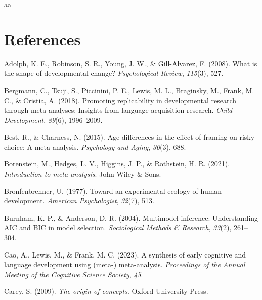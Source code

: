 \documentclass[
  man]{apa6}
\newlength{\cslhangindent}
\newlength{\cslentryspacingunit} %
\newenvironment{CSLReferences}[2] %
 {%
  \setlength{\parindent}{0pt}
  \ifodd #1
  \let\oldpar\par
  \def\par{\hangindent=\cslhangindent\oldpar}
  \fi
  \setlength{\parskip}{#2\cslentryspacingunit}
 }%
 {}
\begin{document}
aa

\newpage

\hypertarget{references}{%
\section{References}\label{references}}

\hypertarget{refs}{}
\begin{CSLReferences}{1}{0}
\leavevmode{}%
Adolph, K. E., Robinson, S. R., Young, J. W., \& Gill-Alvarez, F. (2008). What is the shape of developmental change? \emph{Psychological Review}, \emph{115}(3), 527.

\leavevmode{}%
Bergmann, C., Tsuji, S., Piccinini, P. E., Lewis, M. L., Braginsky, M., Frank, M. C., \& Cristia, A. (2018). Promoting replicability in developmental research through meta-analyses: Insights from language acquisition research. \emph{Child Development}, \emph{89}(6), 1996--2009.

\leavevmode{}%
Best, R., \& Charness, N. (2015). Age differences in the effect of framing on risky choice: A meta-analysis. \emph{Psychology and Aging}, \emph{30}(3), 688.

\leavevmode{}%
Borenstein, M., Hedges, L. V., Higgins, J. P., \& Rothstein, H. R. (2021). \emph{Introduction to meta-analysis}. John Wiley \& Sons.

\leavevmode{}%
Bronfenbrenner, U. (1977). Toward an experimental ecology of human development. \emph{American Psychologist}, \emph{32}(7), 513.

\leavevmode{}%
Burnham, K. P., \& Anderson, D. R. (2004). Multimodel inference: Understanding AIC and BIC in model selection. \emph{Sociological Methods \& Research}, \emph{33}(2), 261--304.

\leavevmode{}%
Cao, A., Lewis, M., \& Frank, M. C. (2023). A synthesis of early cognitive and language development using (meta-) meta-analysis. \emph{Proceedings of the Annual Meeting of the Cognitive Science Society}, \emph{45}.

\leavevmode{}%
Carey, S. (2009). \emph{The origin of concepts}. Oxford University Press.


\end{CSLReferences}
\end{document}

